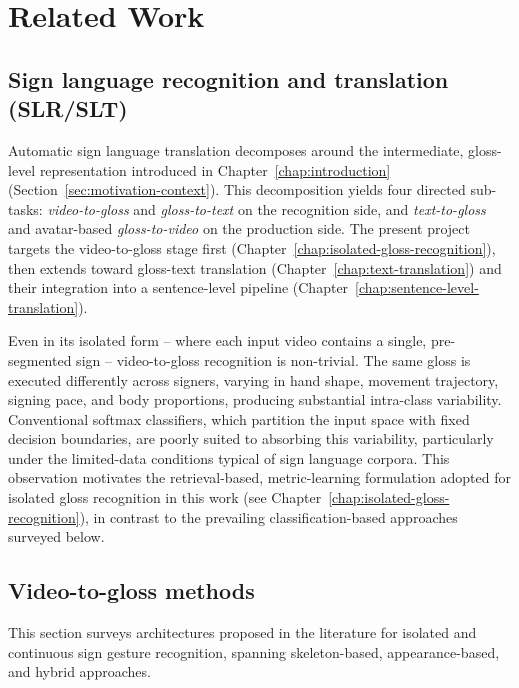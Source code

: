 
\section{Related Work}
\label{chap:related-work}

\subsection{Sign language recognition and translation (SLR/SLT)}
\label{sec:slr-slt-background}

Automatic sign language translation decomposes around the intermediate,
gloss-level representation introduced in Chapter~\ref{chap:introduction}
(Section~\ref{sec:motivation-context}). This decomposition yields four directed
sub-tasks: \emph{video-to-gloss} and \emph{gloss-to-text} on the recognition
side, and \emph{text-to-gloss} and avatar-based \emph{gloss-to-video} on the
production side. The present project targets the video-to-gloss stage first
(Chapter~\ref{chap:isolated-gloss-recognition}), then extends toward gloss-text
translation (Chapter~\ref{chap:text-translation}) and their integration into a
sentence-level pipeline (Chapter~\ref{chap:sentence-level-translation}).

Even in its isolated form -- where each input video contains a single,
pre-segmented sign -- video-to-gloss recognition is non-trivial. The same gloss
is executed differently across signers, varying in hand shape, movement
trajectory, signing pace, and body proportions, producing substantial
intra-class variability. Conventional softmax classifiers, which partition the
input space with fixed decision boundaries, are poorly suited to absorbing this
variability, particularly under the limited-data conditions typical of sign
language corpora. This observation motivates the retrieval-based, metric-learning
formulation adopted for isolated gloss recognition in this work (see
Chapter~\ref{chap:isolated-gloss-recognition}), in contrast to the prevailing
classification-based approaches surveyed below.

\subsection{Video-to-gloss methods}
\label{sec:video-to-gloss-methods}

This section surveys architectures proposed in the literature for isolated and
continuous sign gesture recognition, spanning skeleton-based, appearance-based,
and hybrid approaches.

